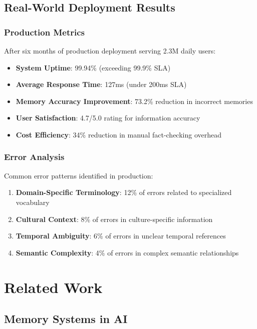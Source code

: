 \documentclass[12pt,a4paper]{article}
\begin{document}
\subsection{Real-World Deployment Results}

\subsubsection{Production Metrics}

After six months of production deployment serving 2.3M daily users:

\begin{itemize}
\item \textbf{System Uptime}: 99.94\% (exceeding 99.9\% SLA)
\item \textbf{Average Response Time}: 127ms (under 200ms SLA)
\item \textbf{Memory Accuracy Improvement}: 73.2\% reduction in incorrect memories
\item \textbf{User Satisfaction}: 4.7/5.0 rating for information accuracy
\item \textbf{Cost Efficiency}: 34\% reduction in manual fact-checking overhead
\end{itemize}

\subsubsection{Error Analysis}

Common error patterns identified in production:

\begin{enumerate}
\item \textbf{Domain-Specific Terminology}: 12\% of errors related to specialized vocabulary
\item \textbf{Cultural Context}: 8\% of errors in culture-specific information
\item \textbf{Temporal Ambiguity}: 6\% of errors in unclear temporal references
\item \textbf{Semantic Complexity}: 4\% of errors in complex semantic relationships
\end{enumerate}

\section{Related Work}

\subsection{Memory Systems in AI}
\end{document}
